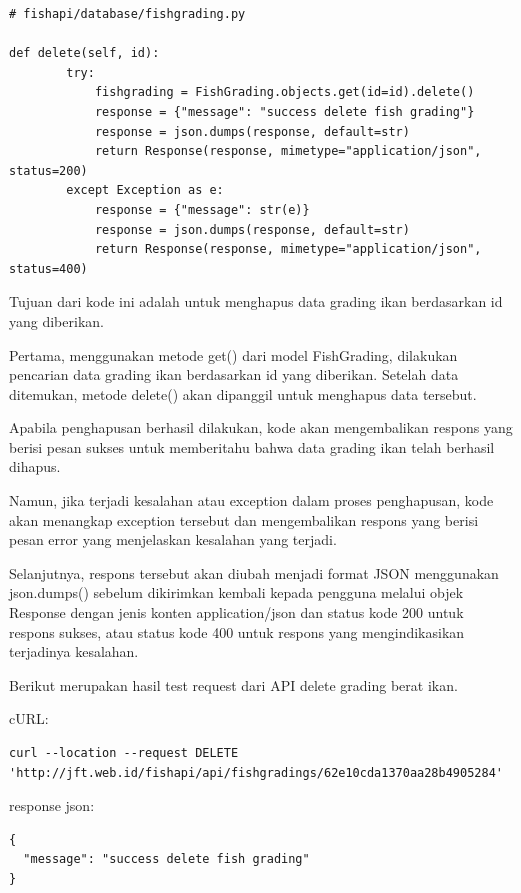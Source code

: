 \begin{enumerate}[1.]
\begin{lstlisting}
# fishapi/database/fishgrading.py

def delete(self, id):
        try:
            fishgrading = FishGrading.objects.get(id=id).delete()
            response = {"message": "success delete fish grading"}
            response = json.dumps(response, default=str)
            return Response(response, mimetype="application/json", status=200)
        except Exception as e:
            response = {"message": str(e)}
            response = json.dumps(response, default=str)
            return Response(response, mimetype="application/json", status=400)
\end{lstlisting}

Tujuan dari kode ini adalah untuk menghapus data grading ikan berdasarkan id yang diberikan.

Pertama, menggunakan metode get() dari model FishGrading, dilakukan pencarian data grading ikan berdasarkan id yang diberikan. Setelah data ditemukan, metode delete() akan dipanggil untuk menghapus data tersebut.

Apabila penghapusan berhasil dilakukan, kode akan mengembalikan respons yang berisi pesan sukses untuk memberitahu bahwa data grading ikan telah berhasil dihapus.

Namun, jika terjadi kesalahan atau exception dalam proses penghapusan, kode akan menangkap exception tersebut dan mengembalikan respons yang berisi pesan error yang menjelaskan kesalahan yang terjadi.

Selanjutnya, respons tersebut akan diubah menjadi format JSON menggunakan json.dumps() sebelum dikirimkan kembali kepada pengguna melalui objek Response dengan jenis konten application/json dan status kode 200 untuk respons sukses, atau status kode 400 untuk respons yang mengindikasikan terjadinya kesalahan.

Berikut merupakan hasil test request dari API delete grading berat ikan.

cURL:

\begin{lstlisting}
curl --location --request DELETE 'http://jft.web.id/fishapi/api/fishgradings/62e10cda1370aa28b4905284'
\end{lstlisting}

response json:

\begin{lstlisting}
{
  "message": "success delete fish grading"
}
\end{lstlisting}



\end{enumerate}
